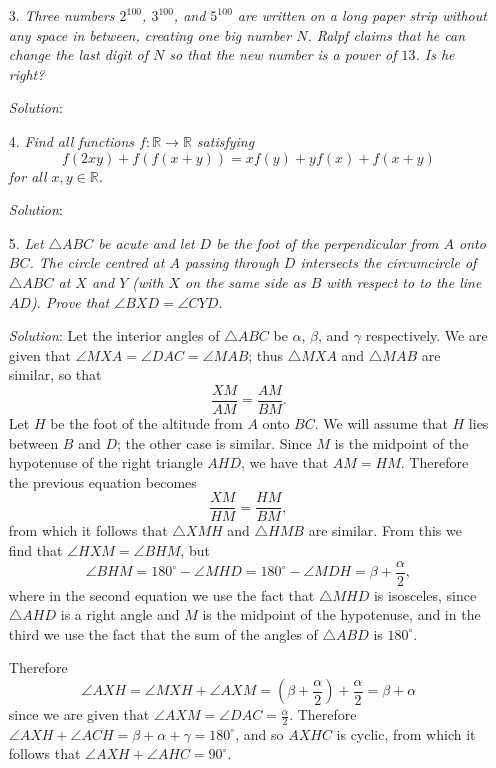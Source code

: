 \documentclass{article}
\begin{document}
\begin{enumerate}[1.]
\item[3.] %
\textit{Three numbers $2^{100}$, $3^{100}$, and $5^{100}$ are written on a long paper strip without any space in between, creating one big number $N$.
Ralpf claims that he can change the last digit of $N$ so that the new number is a power of $13$.
Is he right?}

\textit{Solution}:


\item[4.] %
\textit{Find all functions $f: \mathbb{R} \to \mathbb{R}$ satisfying
\[ f(2xy) +f(f(x+y)) = xf(y) + yf(x) +f(x+y) \]
for all $x,y \in \mathbb{R}$.}

\textit{Solution}:


\item[5.] %
\textit{Let $\triangle ABC$ be acute and let $D$ be the foot of the perpendicular from $A$ onto $BC$.
The circle centred at $A$ passing through $D$ intersects the circumcircle of $\triangle ABC$ at $X$ and $Y$ (with $X$ on the same side as $B$ with respect to to the line $AD$).
Prove that $\angle BXD = \angle CYD$.}

\textit{Solution}:
Let the interior angles of $\triangle ABC$ be $\alpha$, $\beta$, and $\gamma$ respectively.
We are given that $\angle MXA = \angle DAC = \angle MAB$; thus $\triangle MXA$ and $\triangle MAB$ are similar, so that
\[ \frac{XM}{AM} = \frac{AM}{BM}. \]
Let $H$ be the foot of the altitude from $A$ onto $BC$.
We will assume that $H$ lies between $B$ and $D$; the other case is similar.
Since $M$ is the midpoint of the hypotenuse of the right triangle $AHD$, we have that $AM = HM$.
Therefore the previous equation becomes
\[ \frac{XM}{HM} = \frac{HM}{BM}, \]
from which it follows that $\triangle XMH$ and $\triangle HMB$ are similar.
From this we find that $\angle HXM = \angle BHM$, but
\[ \angle BHM = 180^\circ -\angle MHD = 180^\circ -\angle MDH = \beta +\frac{\alpha}{2}, \]
where in the second equation we use the fact that $\triangle MHD$ is isosceles, since $\triangle AHD$ is a right angle and $M$ is the midpoint of the hypotenuse, and in the third we use the fact that the sum of the angles of $\triangle ABD$ is $180^\circ$.

Therefore
\[ \angle AXH = \angle MXH +\angle AXM = \left(\beta+\frac{\alpha}{2}\right) +\frac{\alpha}{2} = \beta +\alpha \]
since we are given that $\angle AXM = \angle DAC = \frac{\alpha}{2}$.
Therefore $\angle AXH +\angle ACH = \beta +\alpha +\gamma = 180^\circ$, and so $AXHC$ is cyclic, from which it follows that $\angle AXH +\angle AHC = 90^\circ$.


\end{enumerate}
\end{document}
